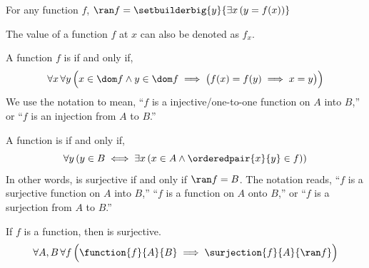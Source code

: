 \begin{cor}
    \label{thm:express-the-range-of-a-function-using-functional-notation}
    For any function \( f \), \( \ran f = \setbuilderbig{y}{\exists x \, \mleft( y = f(x) \mright)} \)
\end{cor}

\begin{dfn}
    \label{dfn:index-notation}
    The value of a function \( f \) at \( x \) can also be denoted as \( f_{x} \).
\end{dfn}

\begin{dfn}[Injection]
    \label{dfn:injection}
    A function \( f \) is  if and only if,
    \begin{equation*}
        \forall x \, \forall y \, \Big( x \in \dom f \land y \in \dom f \implies \big( f(x) = f(y) \implies x = y \big)\Big)
    \end{equation*}
    We use the notation  to mean,
    ``\( f \) is a injective/one-to-one function on \( A \) into \( B \),''
    or
    ``\( f \) is an injection from \( A \) to \( B \).''
\end{dfn}

\begin{dfn}[Surjection]
    \label{dfn:surjection}
    A function  is  if and only if,
    \begin{equation*}
        \forall y \, \mleft( y \in B \iff \exists x \, \mleft( x \in A \land \orderedpair{x}{y} \in f \mright) \mright)
    \end{equation*}
    In other words,  is surjective if and only if \( \ran f = B \).
    The notation  reads,
    ``\( f \) is a surjective function on \( A \) into \( B \),''
    ``\( f \) is a function on \( A \) onto \( B \),'' or
    ``\( f \) is a surjection from \( A \) to \( B \).''
\end{dfn}

\begin{cor}
    \label{thm:every-function-on-its-domain-into-its-range-is-surjective}
    If \( f \) is a function, then  is surjective.
    \begin{equation*}
        \forall A,B \, \forall f \, \Big( \function{f}{A}{B} \implies \surjection{f}{A}{\ran f} \Big)
    \end{equation*}
\end{cor}

